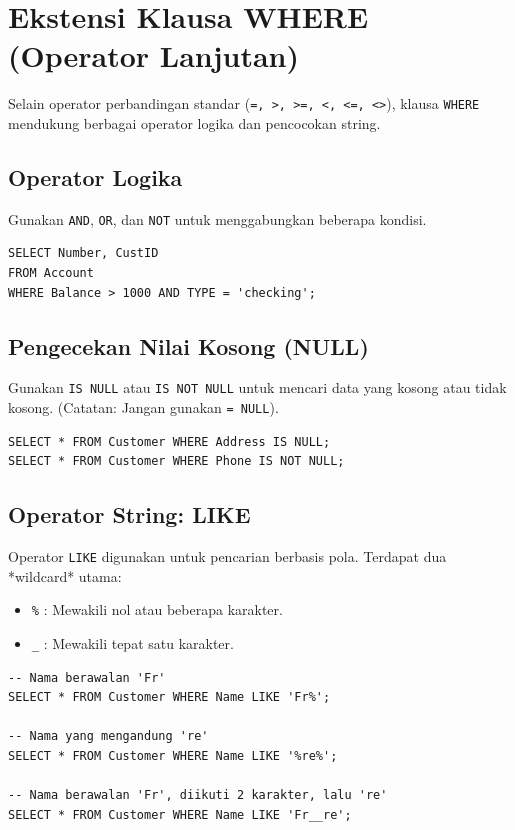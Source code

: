 \documentclass[11pt,a4paper]{article}
\begin{document}
\section{Ekstensi Klausa WHERE (Operator Lanjutan)}

Selain operator perbandingan standar (\texttt{=, >, >=, <, <=, <>}), klausa \texttt{WHERE} mendukung berbagai operator logika dan pencocokan string.

\subsection{Operator Logika}
Gunakan \texttt{AND}, \texttt{OR}, dan \texttt{NOT} untuk menggabungkan beberapa kondisi.
\begin{lstlisting}
SELECT Number, CustID
FROM Account
WHERE Balance > 1000 AND TYPE = 'checking';
\end{lstlisting}

\subsection{Pengecekan Nilai Kosong (NULL)}
Gunakan \texttt{IS NULL} atau \texttt{IS NOT NULL} untuk mencari data yang kosong atau tidak kosong. (Catatan: Jangan gunakan \texttt{= NULL}).
\begin{lstlisting}
SELECT * FROM Customer WHERE Address IS NULL;
SELECT * FROM Customer WHERE Phone IS NOT NULL;
\end{lstlisting}

\subsection{Operator String: LIKE}
Operator \texttt{LIKE} digunakan untuk pencarian berbasis pola. Terdapat dua *wildcard* utama:
\begin{itemize}
	\item \texttt{\%} : Mewakili nol atau beberapa karakter.
	\item \texttt{\_} : Mewakili tepat satu karakter.
\end{itemize}

\begin{lstlisting}
-- Nama berawalan 'Fr'
SELECT * FROM Customer WHERE Name LIKE 'Fr%';

-- Nama yang mengandung 're'
SELECT * FROM Customer WHERE Name LIKE '%re%';

-- Nama berawalan 'Fr', diikuti 2 karakter, lalu 're'
SELECT * FROM Customer WHERE Name LIKE 'Fr__re';
\end{lstlisting}
\end{document}
